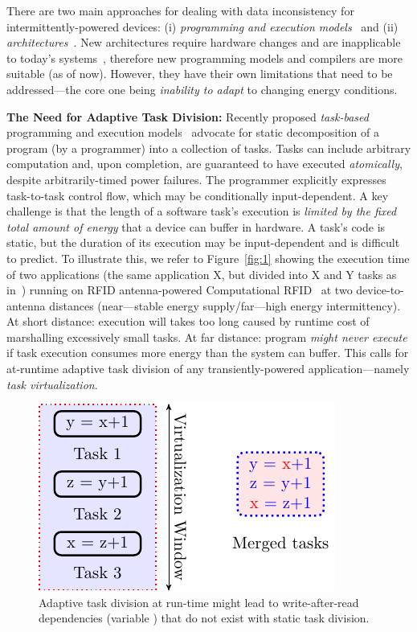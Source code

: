 There are two main approaches for dealing with data inconsistency for intermittently-powered devices: (i) \emph{programming and execution models}~\cite{dino,ratchet,chain,alpaca} and (ii) \emph{architectures}~\cite{hicks_isca_2017,idetic,nvp,tictpl}. New architectures require hardware changes and are inapplicable to today's systems~\cite{hicks_isca_2017,nvp}, therefore new programming models and compilers are more suitable (as of now). However, they have their own limitations that need to be addressed---the core one being \emph{inability to adapt} to changing energy conditions.

\textbf{The Need for Adaptive Task Division:} Recently proposed {\em task-based} programming and execution models~\cite{alpaca,chain} advocate for static decomposition of a program (by a programmer) into a collection of tasks. Tasks can include arbitrary computation and, upon completion, are guaranteed to have executed {\em atomically}, despite arbitrarily-timed power failures. The programmer explicitly expresses task-to-task control flow, which may be conditionally input-dependent. A key challenge is that the length of a software task's execution is \emph{limited by the fixed total amount of energy} that a device can buffer in hardware. A task's code is static, but the duration of its execution may be input-dependent and is difficult to predict. To illustrate this, we refer to Figure~\ref{fig:1} showing the execution time of two applications (the same application X, but divided into X and Y tasks as in~\cite{chain}) running on RFID antenna-powered Computational RFID~\cite{wisp,rf_powered_computing_gollakota_2014} at two device-to-antenna distances (near---stable energy supply/far---high energy intermittency). At short distance: execution will takes too long caused by runtime cost of marshalling excessively small tasks. At far distance: program \emph{might never execute} if task execution consumes more energy than the system can buffer. This calls for at-runtime adaptive task division of any transiently-powered application---namely \emph{task virtualization}.

\begin{figure}
	\includegraphics[width=.5\columnwidth]{presentation/images/alpaca-war.pdf}
	\caption{\label{fig:virtualization}Adaptive task division at run-time might lead to write-after-read dependencies (variable ) that do not exist with static task division.}
\end{figure}

